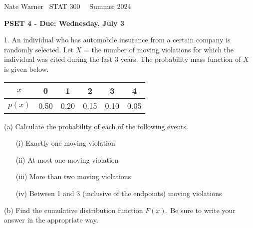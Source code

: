 \documentclass{report}
\title{\Huge{}}
\author{\huge{Nathan Warner}}
\date{\huge{}}
\begin{document}
 \pagebreak \bigbreak \noindent
 Nate Warner \ \quad \quad \quad \quad \quad \quad \quad \quad \quad \quad \quad \quad  STAT 300 \quad  \quad \quad \quad \quad \quad \quad \quad \quad \ \ \quad Summer 2024
 \begin{center}
     \textbf{PSET 4 - Due: Wednesday, July 3}
 \end{center}
 \bigbreak \noindent 
 \begin{mdframed}
     1. An individual who has automobile insurance from a certain company is randomly selected. Let $X$ = the number of moving violations for which the individual was cited during the last 3 years. The probability mass function of $X$ is given below.

     \begin{center}
         \begin{tabular}{|c|c|c|c|c|c|}
             \hline
             $x$ & 0 & 1 & 2 & 3 & 4 \\
             \hline
             $p(x)$ & 0.50 & 0.20 & 0.15 & 0.10 & 0.05 \\
             \hline
         \end{tabular}
     \end{center}
     \bigbreak \noindent 
     (a) Calculate the probability of each of the following events.
     \begin{itemize}
         \item[(i)] Exactly one moving violation
         \item[(ii)] At most one moving violation
         \item[(iii)] More than two moving violations
         \item[(iv)] Between 1 and 3 (inclusive of the endpoints) moving violations
     \end{itemize}
     \bigbreak \noindent 
     (b) Find the cumulative distribution function $F(x)$. Be sure to write your answer in the appropriate way.
 \end{mdframed}
\end{document}
